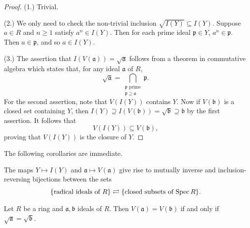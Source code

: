 \begin{proof}
	(1.) Trivial.
	
	(2.) We only need to check the non-trivial inclusion $\sqrt{I(Y)} \subseteq I(Y)$. Suppose $a \in R$ and $n \geq 1$ satisfy $a^n \in I(Y)$. Then for each prime ideal $\mathfrak{p} \in Y$, $a^n \in \mathfrak{p}$. Then $a \in \mathfrak{p}$, and so $a \in I(Y)$.
	
	(3.) The assertion that $I(V(\mathfrak{a})) = \sqrt{\mathfrak{a}}$ follows from a theorem in commutative algebra which states that, for any ideal $\mathfrak{a}$ of $R$,
	\begin{equation*}
		\sqrt{\mathfrak{a}} = \bigcap_{\substack{\mathfrak{p} \text{ prime} \\ \mathfrak{p} \supseteq \mathfrak{a}}} \mathfrak{p}.
	\end{equation*}
	For the second assertion, note that $V(I(Y))$ contains $Y$. Now if $V(\mathfrak{b})$ is a closed set containing $Y$, then $I(Y) \supseteq I(V(\mathfrak{b})) = \sqrt{\mathfrak{b}} \supseteq \mathfrak{b}$ by the first assertion. It follows that 
	\begin{equation*}
		V(I(Y)) \subseteq V(\mathfrak{b}),
	\end{equation*}
	proving that $V(I(Y))$ is the closure of $Y$.
\end{proof}

The following corollaries are immediate.
\begin{corollary}\label{chap2:V-and-I-inverse}
	The maps $Y \mapsto I(Y)$ and $\mathfrak{a} \mapsto V(\mathfrak{a})$ give rise to mutually inverse and inclusion-reversing bijections between the sets
	\begin{equation*}
		\Set*{\text{radical ideals of $R$}} \rightleftarrows \Set*{\text{closed subsets of $\Spec R$}}.
	\end{equation*}
\end{corollary}

\begin{corollary}
	Let $R$ be a ring and $\mathfrak{a}, \mathfrak{b}$ ideals of $R$. Then $V(\mathfrak{a}) = V(\mathfrak{b})$ if and only if $\sqrt{\mathfrak{a}} = \sqrt{\mathfrak{b}}$.
\end{corollary}


